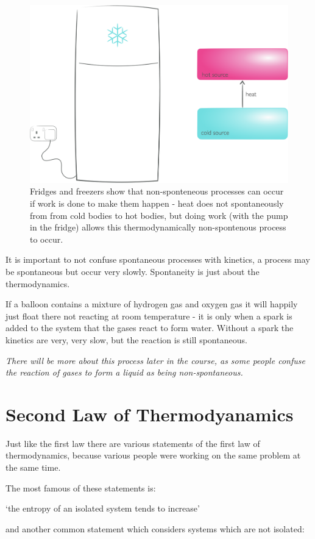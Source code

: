 \documentclass[
]{book}
\begin{document}
\begin{figure}

{\centering \includegraphics[width=0.5\linewidth]{images/fridge} 

}

\caption{Fridges and freezers show that non-sponteneous processes can occur if work is done to make them happen - heat does not spontaneously from from cold bodies to hot bodies, but doing work (with the pump in the fridge) allows this thermodynamically non-spontenous process to occur.}\label{fig:fridge}
\end{figure}

It is important to not confuse spontaneous processes with kinetics, a process may be spontaneous but occur very slowly. Spontaneity is just about the thermodynamics.

If a balloon contains a mixture of hydrogen gas and oxygen gas it will happily just float there not reacting at room temperature - it is only when a spark is added to the system that the gases react to form water. Without a spark the kinetics are very, very slow, but the reaction is still spontaneous.

\emph{There will be more about this process later in the course, as some people confuse the reaction of gases to form a liquid as being non-spontaneous.}

\hypertarget{sec:2ndlaw}{%
\section{Second Law of Thermodyanamics}\label{sec:2ndlaw}}

Just like the first law there are various statements of the first law of thermodynamics, because various people were working on the same problem at the same time.

The most famous of these statements is:

`the entropy of an isolated system tends to increase'

and another common statement which considers systems which are not isolated:
\end{document}
